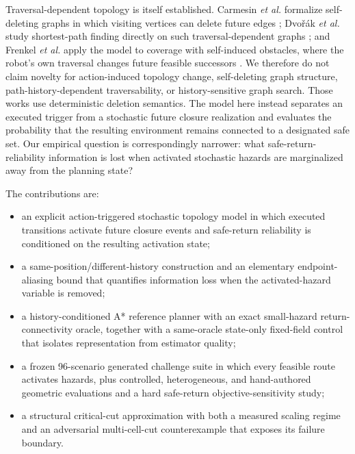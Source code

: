 \documentclass[conference]{IEEEtran}
\begin{document}
Traversal-dependent topology is itself established. Carmesin \emph{et al.} formalize self-deleting graphs in which visiting vertices can delete future edges \cite{carmesin2023selfdeleting}; Dvo\v{r}\'ak \emph{et al.} study shortest-path finding directly on such traversal-dependent graphs \cite{dvorak2025selfdeleting}; and Frenkel \emph{et al.} apply the model to coverage with self-induced obstacles, where the robot's own traversal changes future feasible successors \cite{frenkel2026selfinduced}. We therefore do not claim novelty for action-induced topology change, self-deleting graph structure, path-history-dependent traversability, or history-sensitive graph search. Those works use deterministic deletion semantics. The model here instead separates an executed trigger from a stochastic future closure realization and evaluates the probability that the resulting environment remains connected to a designated safe set. Our empirical question is correspondingly narrower: what safe-return-reliability information is lost when activated stochastic hazards are marginalized away from the planning state?

The contributions are:
\begin{itemize}
  \item an explicit action-triggered stochastic topology model in which executed transitions activate future closure events and safe-return reliability is conditioned on the resulting activation state;
  \item a same-position/different-history construction and an elementary endpoint-aliasing bound that quantifies information loss when the activated-hazard variable is removed;
  \item a history-conditioned A* reference planner with an exact small-hazard return-connectivity oracle, together with a same-oracle state-only fixed-field control that isolates representation from estimator quality;
  \item a frozen 96-scenario generated challenge suite in which every feasible route activates hazards, plus controlled, heterogeneous, and hand-authored geometric evaluations and a hard safe-return objective-sensitivity study;
  \item a structural critical-cut approximation with both a measured scaling regime and an adversarial multi-cell-cut counterexample that exposes its failure boundary.
\end{itemize}
\end{document}

